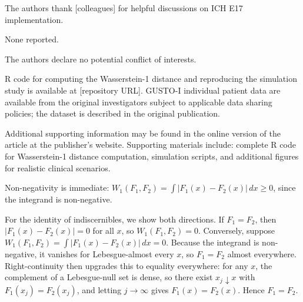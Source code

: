 \documentclass[AMA,Times1COL]{WileyNJDv5}
\begin{document}

The authors thank [colleagues] for helpful discussions on ICH E17 implementation.


None reported.


The authors declare no potential conflict of interests.


R code for computing the Wasserstein-1 distance and reproducing the simulation study is available at [repository URL]. GUSTO-I individual patient data are available from the original investigators subject to applicable data sharing policies; the dataset is described in the original publication.\cite{gusto1993}




Additional supporting information may be found in the online version of the article at the publisher's website. Supporting materials include: complete R code for Wasserstein-1 distance computation, simulation scripts, and additional figures for realistic clinical scenarios.

\appendix



Non-negativity is immediate: $W_1(F_1, F_2) = \int |F_1(x) - F_2(x)| \, dx \geq 0$, since the integrand is non-negative.

For the identity of indiscernibles, we show both directions. If $F_1 = F_2$, then $|F_1(x) - F_2(x)| = 0$ for all $x$, so $W_1(F_1, F_2) = 0$. Conversely, suppose $W_1(F_1, F_2) = \int |F_1(x) - F_2(x)| \, dx = 0$. Because the integrand is non-negative, it vanishes for Lebesgue-almost every $x$, so $F_1 = F_2$ almost everywhere. Right-continuity then upgrades this to equality everywhere: for any $x$, the complement of a Lebesgue-null set is dense, so there exist $x_j \downarrow x$ with $F_1(x_j) = F_2(x_j)$, and letting $j \to \infty$ gives $F_1(x) = F_2(x)$. Hence $F_1 = F_2$.
\end{document}
